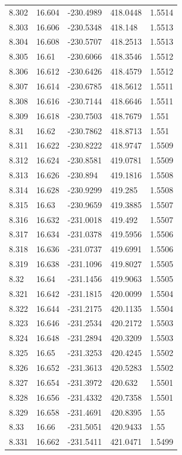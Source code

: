 \begin{tabular}{lllll}
8.302 & 16.604 & -230.4989 & 418.0448 & 1.5514 \\
8.303 & 16.606 & -230.5348 & 418.148 & 1.5513 \\
8.304 & 16.608 & -230.5707 & 418.2513 & 1.5513 \\
8.305 & 16.61 & -230.6066 & 418.3546 & 1.5512 \\
8.306 & 16.612 & -230.6426 & 418.4579 & 1.5512 \\
8.307 & 16.614 & -230.6785 & 418.5612 & 1.5511 \\
8.308 & 16.616 & -230.7144 & 418.6646 & 1.5511 \\
8.309 & 16.618 & -230.7503 & 418.7679 & 1.551 \\
8.31 & 16.62 & -230.7862 & 418.8713 & 1.551 \\
8.311 & 16.622 & -230.8222 & 418.9747 & 1.5509 \\
8.312 & 16.624 & -230.8581 & 419.0781 & 1.5509 \\
8.313 & 16.626 & -230.894 & 419.1816 & 1.5508 \\
8.314 & 16.628 & -230.9299 & 419.285 & 1.5508 \\
8.315 & 16.63 & -230.9659 & 419.3885 & 1.5507 \\
8.316 & 16.632 & -231.0018 & 419.492 & 1.5507 \\
8.317 & 16.634 & -231.0378 & 419.5956 & 1.5506 \\
8.318 & 16.636 & -231.0737 & 419.6991 & 1.5506 \\
8.319 & 16.638 & -231.1096 & 419.8027 & 1.5505 \\
8.32 & 16.64 & -231.1456 & 419.9063 & 1.5505 \\
8.321 & 16.642 & -231.1815 & 420.0099 & 1.5504 \\
8.322 & 16.644 & -231.2175 & 420.1135 & 1.5504 \\
8.323 & 16.646 & -231.2534 & 420.2172 & 1.5503 \\
8.324 & 16.648 & -231.2894 & 420.3209 & 1.5503 \\
8.325 & 16.65 & -231.3253 & 420.4245 & 1.5502 \\
8.326 & 16.652 & -231.3613 & 420.5283 & 1.5502 \\
8.327 & 16.654 & -231.3972 & 420.632 & 1.5501 \\
8.328 & 16.656 & -231.4332 & 420.7358 & 1.5501 \\
8.329 & 16.658 & -231.4691 & 420.8395 & 1.55 \\
8.33 & 16.66 & -231.5051 & 420.9433 & 1.55 \\
8.331 & 16.662 & -231.5411 & 421.0471 & 1.5499 \\

\end{tabular}
